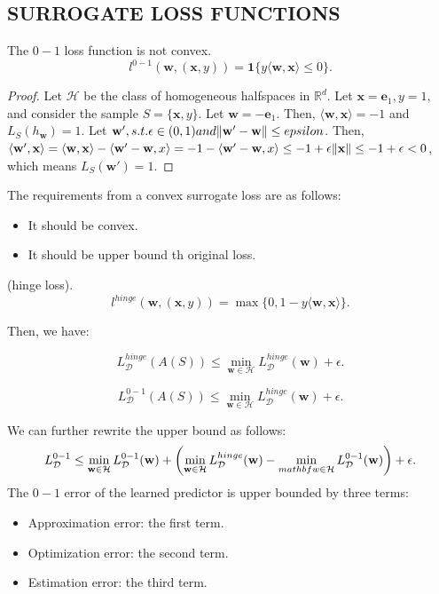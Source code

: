 \subsection{SURROGATE LOSS FUNCTIONS}

The $ 0-1 $ loss function is not convex.
\[ l^{0-1}(\mathbf{w},(\mathbf{x},y))=\mathbf{1}\{ y \langle \mathbf{w}, \mathbf{x} \rangle \le 0 \}.\]
\begin{proof}
	Let $ \mathcal{H} $ be the class of homogeneous halfspaces in $ \mathbb{R}^d $.
	Let $ \mathbf{x} = \mathbf{e}_1, y = 1 $, and consider the sample $ S = \{ \mathbf{x}, y \} $.
	Let $ \mathbf{w} = -\mathbf{e}_1 $.
	Then, $ \langle \mathbf{w}, \mathbf{x} \rangle = -1 $ and $ L_S(h_{\mathbf{w}}) = 1 $.
	Let $ \mathbf{w}',s.t.\epsilon \in (0,1) and \Arrowvert \mathbf{w}' - \mathbf{w} \Arrowvert \le epsilon $.
	Then,$ \langle \mathbf{w}',\mathbf{x} \rangle = \langle \mathbf{w}, \mathbf{x} \rangle 
	- \langle \mathbf{w}'-\mathbf{w}, x \rangle = -1 - \langle \mathbf{w}'-\mathbf{w}, x \rangle
	\le -1 + \epsilon \Arrowvert \mathbf{x} \Arrowvert \le -1+\epsilon < 0$, which means
	$ L_S(\mathbf{w}')=1 $.
\end{proof}

The requirements from a convex surrogate loss are as follows:
\begin{itemize}
	\item It should be convex.
	\item It should be upper bound th original loss.
\end{itemize}

\begin{defn}
	(hinge loss).
	\[ l^{hinge}(\mathbf{w}, (\mathbf{x},y)) = \max \{ 0, 1-y \langle \mathbf{w}, \mathbf{x} \rangle \}.\]
\end{defn}

Then, we have:

\[ L^{hinge}_{\mathcal{D}}(A(S)) \le \min\limits_{\mathbf{w} \in \mathcal{H}} 
L^{hinge}_{\mathcal{D}}(\mathbf{w})+\epsilon.\]

\[ L^{0-1}_{\mathcal{D}}(A(S)) \le \min\limits_{\mathbf{w} \in \mathcal{H}}
L^{hinge}_{\mathcal{D}}(\mathbf{w})+\epsilon.\]

We can further rewrite the upper bound as follows:
\[ L^{0-1}_{\mathcal{D}} \le \min\limits_{\mathbf{w}\in\mathcal{H}} L^{0-1}_{\mathcal{D}}(\mathbf{w})
	+
	\left(
		\min\limits_{\mathbf{w}\in\mathcal{H}} L^{hinge}_{\mathcal{D}}(\mathbf{w})
		- \min\limits_{\\mathbf{w}\in\mathcal{H}} L^{0-1}_{\mathcal{D}}(\mathbf{w})
	\right)
+\epsilon.\]
The $ 0-1 $ error of the learned predictor is upper bounded by three terms:
\begin{itemize}
	\item Approximation error: the first term.
	\item Optimization error: the second term.
	\item Estimation error: the third term.
\end{itemize}



